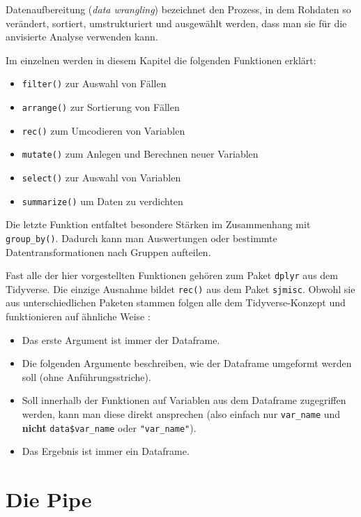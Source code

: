 \documentclass[
]{book}
\begin{document}
Datenaufbereitung (\emph{data wrangling}) bezeichnet den Prozess, in dem Rohdaten so verändert, sortiert, umstrukturiert und ausgewählt werden, dass man sie für die anvisierte Analyse verwenden kann.

Im einzelnen werden in diesem Kapitel die folgenden Funktionen erklärt:

\begin{itemize}
\item
  \texttt{filter()} zur Auswahl von Fällen
\item
  \texttt{arrange()} zur Sortierung von Fällen
\item
  \texttt{rec()} zum Umcodieren von Variablen
\item
  \texttt{mutate()} zum Anlegen und Berechnen neuer Variablen
\item
  \texttt{select()} zur Auswahl von Variablen
\item
  \texttt{summarize()} um Daten zu verdichten
\end{itemize}

Die letzte Funktion entfaltet besondere Stärken im Zusammenhang mit \texttt{group\_by()}. Dadurch kann man Auswertungen oder bestimmte Datentransformationen nach Gruppen aufteilen.

Fast alle der hier vorgestellten Funktionen gehören zum Paket \texttt{dplyr} aus dem Tidyverse. Die einzige Ausnahme bildet \texttt{rec()} aus dem Paket \texttt{sjmisc}. Obwohl sie aus unterschiedlichen Paketen stammen folgen alle dem Tidyverse-Konzept und funktionieren auf ähnliche Weise \citep[vgl.][Kap. 5.1.3]{Wickham_2017}:

\begin{itemize}
\item
  Das erste Argument ist immer der Dataframe.
\item
  Die folgenden Argumente beschreiben, wie der Dataframe umgeformt werden soll (ohne Anführungsstriche).
\item
  Soll innerhalb der Funktionen auf Variablen aus dem Dataframe zugegriffen werden, kann man diese direkt ansprechen (also einfach nur \texttt{var\_name} und \textbf{nicht} \texttt{data\$var\_name} oder \texttt{"var\_name"}).
\item
  Das Ergebnis ist immer ein Dataframe.
\end{itemize}

\hypertarget{pipe}{%
\section{Die Pipe}\label{pipe}}
\end{document}

